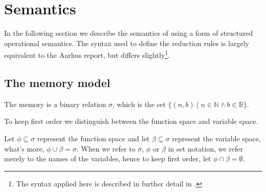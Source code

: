 \section{Semantics}\label{section:d-sos}





In the following section we describe the semantics of \D{} using a form of
structured operational semantics. The syntax used to define the reduction rules
is largely equivalent to the Aarhus report\cite{sos}, but differs
slightly\footnote{The syntax applied here is described in further detail in
.}.

\subsection{The memory model}\label{section:d-semantics-memory}

\begin{definition}\label{definition:memory} The memory is a binary relation
$\sigma$, which is the set $\{(n,b)\mid n\in\mathbb{N} \wedge
b\in\mathbb{B}\}$.\end{definition}




To keep \D{} first order we distinguish between the function space and variable
space.

\begin{definition} Let $\phi\subseteq\sigma$ represent the function space and
let $\beta\subseteq\sigma$ represent the variable space, what's more,
$\phi\cup\beta=\sigma$. When we refer to $\sigma$, $\phi$ or $\beta$ in set
notation, we refer merely to the names of the variables, hence to keep \D{}
first order, let $\phi\cap\beta=\emptyset$.\end{definition}

